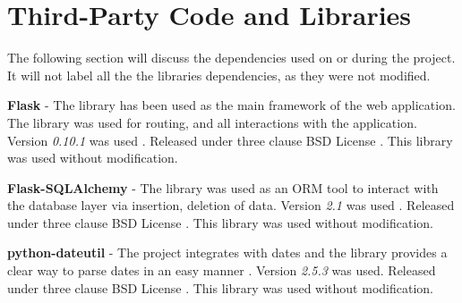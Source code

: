   \chapter{Third-Party Code and Libraries}







The following section will discuss the dependencies used on or during the project. It will not label all the the libraries dependencies, as they were not modified.

\textbf{Flask} - The library has been used as the main framework of the web application. The library was used for routing, and all interactions with the application. Version \textit{0.10.1} was used \cite{citeulike:13160396}. Released under three clause BSD License \cite{citeulike:14025861}. This library was used without modification.

\textbf{Flask-SQLAlchemy} - The library was used as an ORM tool to interact with the database layer via insertion, deletion of data. Version \textit{2.1} was used \cite{citeulike:14025864}. Released under three clause BSD License \cite{citeulike:14025861}. This library was used without modification.

\textbf{python-dateutil} - The project integrates with dates and the library provides a clear way to parse dates in an easy manner \cite{citeulike:14025869}. Version \textit{2.5.3} was used. Released under three clause BSD License \cite{citeulike:14025861}. This library was used without modification.

